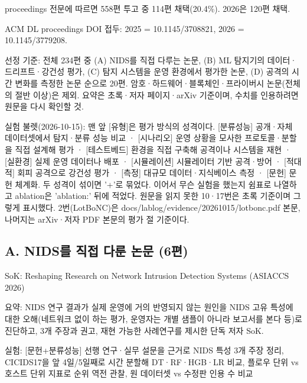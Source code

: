 \par\noindent \textbullet{} proceedings 전문에 따르면 558편 투고 중 114편 채택(20.4\%). 2026은 120편 채택.


\par\noindent \textbullet\enspace ACM DL proceedings DOI 접두: 2025 =\allowbreak{} 10.1145/\allowbreak{}3708821, 2026 =\allowbreak{} 10.1145/\allowbreak{}3779208.


선정 기준: 전체 234편 중 (A) NIDS를 직접 다루는 논문, (B) ML 탐지기의 데이터·드리프트·강건성 평가, (C) 탐지 시스템을 운영 환경에서 평가한 논문, (D) 공격의 시간 변화를 측정한 논문 순으로 20편. 암호·하드웨어·블록체인·프라이버시 논문(전체의 절반 이상)은 제외. 요약은 초록·저자 페이지·arXiv 기준이며, 수치를 인용하려면 원문을 다시 확인할 것.

실험 불렛(2026-10-15): 맨 앞 [유형]은 평가 방식의 성격이다. [분류성능] 공개·자체 데이터셋에서 탐지·분류 성능 비교 · [시나리오] 운영 상황을 모사한 프로토콜·분할을 직접 설계해 평가 · [테스트베드] 환경을 직접 구축해 공격이나 시스템을 재현 · [실환경] 실제 운영 데이터나 배포 · [시뮬레이션] 시뮬레이터 기반 공격·방어 · [적대적] 회피 공격으로 강건성 평가 · [측정] 대규모 데이터·지식베이스 측정 · [문헌] 문헌 체계화. 두 성격이 섞이면 '+\allowbreak{}'로 묶었다. 이어서 무슨 실험을 했는지 쉼표로 나열하고 ablation은 'ablation:' 뒤에 적었다. 원문을 읽지 못한 10·17번은 초록 기준이며 그렇게 표시했다. 2번(LotBoNC)은 docs/\allowbreak{}lablog/\allowbreak{}evidence/\allowbreak{}20261015/\allowbreak{}lotbonc.pdf 본문, 나머지는 arXiv·저자 PDF 본문의 평가 절 기준이다.

\subsection{A. NIDS를 직접 다룬 논문 (6편)}
\par\noindent \textbullet\enspace SoK: Reshaping Research on Network Intrusion Detection Systems (ASIACCS 2026)

\par\noindent \textbullet\enspace 요약: NIDS 연구 결과가 실제 운영에 거의 반영되지 않는 원인을 NIDS 고유 특성에 대한 오해(네트워크 없이 하는 평가, 운영자는 개별 샘플이 아니라 보고서를 본다 등)로 진단하고, 3개 주장과 권고, 재현 가능한 사례연구를 제시한 단독 저자 SoK.


\par\noindent \textbullet\enspace 실험: [문헌+\allowbreak{}분류성능] 선행 연구·실무 설문을 근거로 NIDS 특성 3개 주장 정리, CICIDS17을 앞 4일/\allowbreak{}5일째로 시간 분할해 DT·RF·HGB·LR 비교, 플로우 단위 vs 호스트 단위 지표로 순위 역전 관찰, 원 데이터셋 vs 수정판 인용 수 비교


